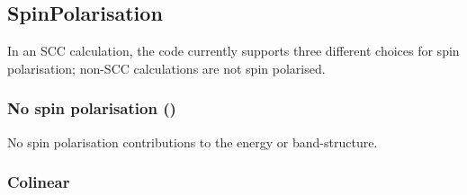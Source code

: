 \subsection{SpinPolarisation}
\label{sec:dftbp.SpinPolarisation}

In an SCC calculation, the code currently supports three different
choices for spin polarisation; non-SCC calculations are not spin
polarised.

\subsubsection{No spin polarisation (\is{\cb})}


No spin polarisation contributions to the energy or band-structure.

\subsubsection{Colinear\cb}
\label{sec:dftbp.Colinear}

